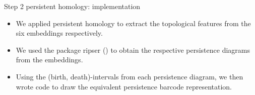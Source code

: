 \documentclass[xcolor={dvipsnames,svgnames}]{beamer}
\begin{document}
\begin{frame}{Step 2 persistent homology: implementation}
\begin{itemize}
    \item We applied persistent homology to extract the topological features from the six embeddings respectively.

    \item We used the package ripser (\cite{ctralie2018ripser}) to obtain the respective persistence diagrams from the embeddings.
    
    \item Using the (birth, death)-intervals from each persistence diagram, we then wrote code to draw the equivalent persistence barcode representation.
\end{itemize}
\end{frame}
\end{document}
